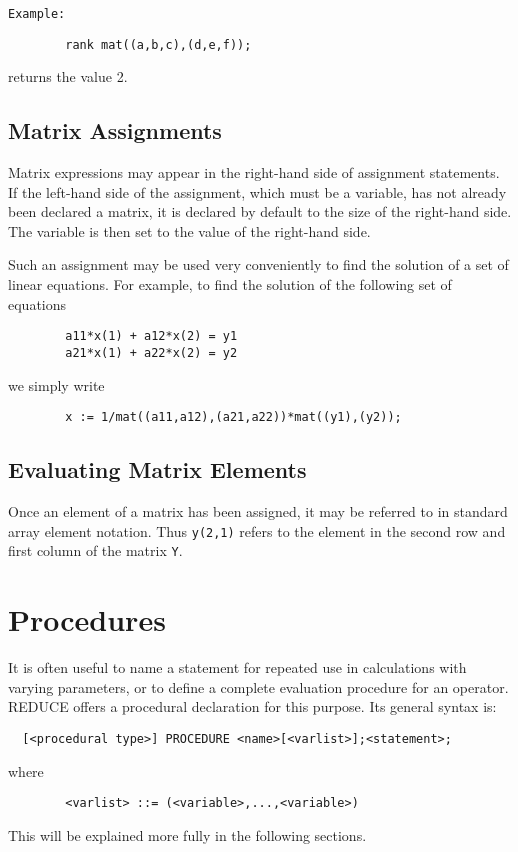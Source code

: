 \documentclass[11pt,letterpaper]{book}
\makeatletter
\newcommand{\REDUCE}{REDUCE}
\newcommand{\underscore}{\_}
\newcommand{\ttindex}[1]{{\renewcommand{\_}{\protect\underscore}%
                          \index{#1@{\tt #1}}}}
\makeatother
\begin{document}
{\tt Example:}

{\small\begin{verbatim}
        rank mat((a,b,c),(d,e,f));
\end{verbatim}}
returns the value 2.

\section{Matrix Assignments} 

Matrix expressions may appear in the right-hand side of assignment
statements. If the left-hand side of the assignment, which must be a
variable, has not already been declared a matrix, it is declared by default
to the size of the right-hand side. The variable is then set to the value
of the right-hand side.

Such an assignment may be used very conveniently to find the solution of a
set of linear equations. For example, to find the solution of the
following set of equations
{\small\begin{verbatim}
        a11*x(1) + a12*x(2) = y1
        a21*x(1) + a22*x(2) = y2
\end{verbatim}}
we simply write
{\small\begin{verbatim}
        x := 1/mat((a11,a12),(a21,a22))*mat((y1),(y2));
\end{verbatim}}

\section{Evaluating Matrix Elements}

Once an element of a matrix has been assigned, it may be referred to in
standard array element notation.  Thus {\tt y(2,1)} refers to the element
in the second row and first column of the matrix {\tt Y}.

\chapter{Procedures}\ttindex{PROCEDURE}

It is often useful to name a statement for repeated use in calculations
with varying parameters, or to define a complete evaluation procedure for
an operator. {\REDUCE} offers a procedural declaration for this purpose. Its
general syntax is:
{\small\begin{verbatim}
  [<procedural type>] PROCEDURE <name>[<varlist>];<statement>;
\end{verbatim}}
where
{\small\begin{verbatim}
        <varlist> ::= (<variable>,...,<variable>)
\end{verbatim}}
This will be explained more fully in the following sections.
\end{document}
